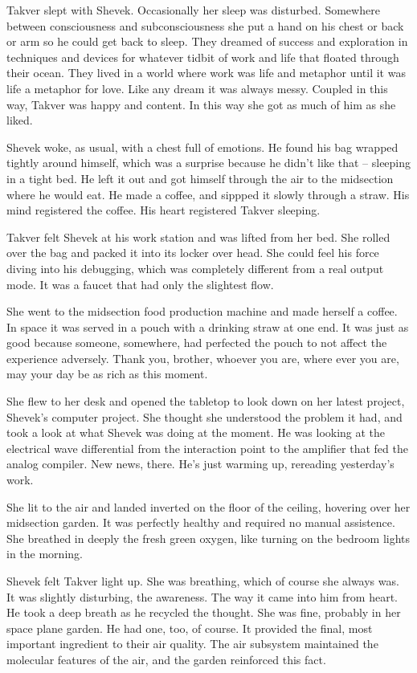 Takver slept with Shevek.  Occasionally her sleep was disturbed.
Somewhere between consciousness and subconsciousness she put a hand on
his chest or back or arm so he could get back to sleep.  They dreamed
of success and exploration in techniques and devices for whatever
tidbit of work and life that floated through their ocean.  They lived
in a world where work was life and metaphor until it was life a
metaphor for love.  Like any dream it was always messy.  Coupled in
this way, Takver was happy and content.  In this way she got as much
of him as she liked.

Shevek woke, as usual, with a chest full of emotions.  He found his
bag wrapped tightly around himself, which was a surprise because he
didn't like that -- sleeping in a tight bed.  He left it out and got
himself through the air to the midsection where he would eat.  He made
a coffee, and sippped it slowly through a straw.  His mind registered
the coffee.  His heart registered Takver sleeping.

Takver felt Shevek at his work station and was lifted from her bed.
She rolled over the bag and packed it into its locker over head.  She
could feel his force diving into his debugging, which was completely
different from a real output mode.  It was a faucet that had only the
slightest flow.

She went to the midsection food production machine and made herself a
coffee.  In space it was served in a pouch with a drinking straw at
one end.  It was just as good because someone, somewhere, had
perfected the pouch to not affect the experience adversely.  Thank
you, brother, whoever you are, where ever you are, may your day be as
rich as this moment.

She flew to her desk and opened the tabletop to look down on her
latest project, Shevek's computer project.  She thought she understood
the problem it had, and took a look at what Shevek was doing at the
moment.  He was looking at the electrical wave differential from the
interaction point to the amplifier that fed the analog compiler.  New
news, there.  He's just warming up, rereading yesterday's work.

She lit to the air and landed inverted on the floor of the ceiling,
hovering over her midsection garden.  It was perfectly healthy and
required no manual assistence.  She breathed in deeply the fresh green
oxygen, like turning on the bedroom lights in the morning.

Shevek felt Takver light up.  She was breathing, which of course she
always was.  It was slightly disturbing, the awareness.  The way it
came into him from heart.  He took a deep breath as he recycled the
thought.  She was fine, probably in her space plane garden.  He had
one, too, of course.  It provided the final, most important ingredient
to their air quality.  The air subsystem maintained the molecular
features of the air, and the garden reinforced this fact.

